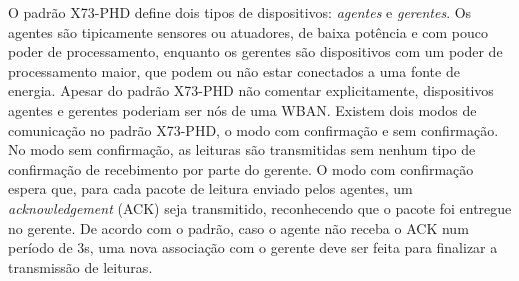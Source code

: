 O padrão X73-PHD define dois tipos de dispositivos: \emph{agentes} e \emph{gerentes}. Os agentes são tipicamente sensores ou atuadores, de baixa potência e com pouco poder de processamento, enquanto os gerentes são dispositivos com um poder de processamento maior, que podem ou não estar conectados a uma fonte de energia. Apesar do padrão X73-PHD não comentar explicitamente, dispositivos agentes e gerentes poderiam ser nós de uma WBAN.
Existem dois modos de comunicação no padrão X73-PHD, o modo com confirmação e sem confirmação. No modo sem confirmação, as leituras são transmitidas sem nenhum tipo de confirmação de recebimento por parte do gerente. O modo com confirmação espera que, para cada pacote de leitura enviado pelos agentes, um \textit{acknowledgement} (ACK) seja transmitido, reconhecendo que o pacote foi entregue no gerente. De acordo com o padrão, caso o agente não receba o ACK num período de 3s, uma nova associação com o gerente deve ser feita para finalizar a transmissão de leituras. 

